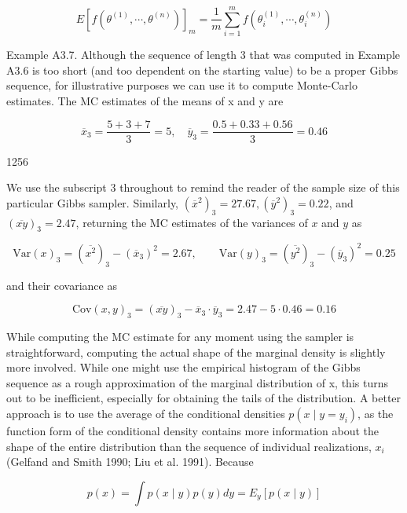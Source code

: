 \documentclass{article}
\begin{document}
\begin{equation}
E[f(\theta^{(1)},\cdots,\theta^{(n)})]_{m}=\frac{1}{m}\sum_{i=1}^{m}f(\theta_{i}^{(1)},\cdots,\theta_{i}^{(n)})
\end{equation}

Example A3.7. Although the sequence of length 3 that was computed in Example A3.6 is too short (and too dependent on the starting value) to be a proper Gibbs sequence, for illustrative purposes we can use it to compute Monte-Carlo estimates. The MC estimates of the means of x and y are

\begin{equation}
\overline{x}_{3}=\frac{5+3+7}{3}=5,\quad\overline{y}_{3}=\frac{0.5+0.33+0.56}{3}=0.46
\end{equation}

1256

We use the subscript 3 throughout to remind the reader of the sample size of this particular Gibbs sampler. Similarly,  $ (\overline{x}^2)_3 = 27.67, (\overline{y}^2)_3 = 0.22 $, and  $ (\overline{xy})_3 = 2.47 $, returning the MC estimates of the variances of  $ x $ and  $ y $ as

\begin{equation}
\mathrm{Var}(x)_{3}=(\overline{x^{2}})_{3}-(\overline{x}_{3})^{2}=2.67,\qquad\mathrm{Var}(y)_{3}=(\overline{y^{2}})_{3}-(\overline{y}_{3})^{2}=0.25
\end{equation}

and their covariance as

\begin{equation}
\mathrm{Cov}(x,y)_{3}=(\overline{xy})_{3}-\overline{x}_{3}\cdot\overline{y}_{3}=2.47-5\cdot0.46=0.16
\end{equation}

While computing the MC estimate for any moment using the sampler is straightforward, computing the actual shape of the marginal density is slightly more involved. While one might use the empirical histogram of the Gibbs sequence as a rough approximation of the marginal distribution of x, this turns out to be inefficient, especially for obtaining the tails of the distribution. A better approach is to use the average of the conditional densities  $ p(x \mid y = y_i) $, as the function form of the conditional density contains more information about the shape of the entire distribution than the sequence of individual realizations,  $ x_i $ (Gelfand and Smith 1990; Liu et al. 1991). Because

\begin{equation}
p(x)=\int p(x\mid y)p(y)dy=E_{y}\left[p(x\mid y)\right]
\end{equation}
\end{document}
